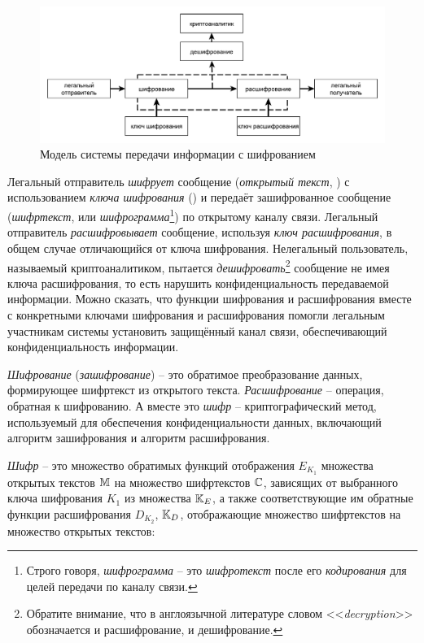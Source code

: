 \begin{figure}[!thb]
	\centering
	\includegraphics[width=1.0\textwidth]{pic/model-cipher}
	\caption{Модель системы передачи информации с шифрованием\label{pic:model-cipher}}
\end{figure}

Легальный отправитель \emph{шифрует} сообщение (\emph{открытый текст}, ) с использованием \emph{ключа шифрования} () и передаёт зашифрованное сообщение (\emph{шифртекст},  или \emph{шифрограмма}\footnote{Строго говоря, \emph{шифрограмма} -- это \emph{шифротекст} после его \emph{кодирования} для целей передачи по каналу связи.}) по открытому каналу связи. Легальный отправитель \emph{расшифровывает} сообщение, используя \emph{ключ расшифрования}, в общем случае отличающийся от ключа шифрования. Нелегальный пользователь, называемый криптоаналитиком, пытается \emph{дешифровать}\footnote{Обратите внимание, что в англоязычной литературе словом <<\textit{decryption}>> обозначается и расшифрование, и дешифрование.} сообщение не имея ключа расшифрования, то есть нарушить конфиденциальность передаваемой информации. Можно сказать, что функции шифрования и расшифрования вместе с конкретными ключами шифрования и расшифрования помогли легальным участникам системы установить защищённый канал связи, обеспечивающий конфиденциальность информации.

\emph{Шифрование} (\emph{зашифрование}) -- это обратимое преобразование данных, формирующее шифртекст из открытого текста. \emph{Расшифрование} -- операция, обратная к шифрованию. А вместе это \emph{шифр} -- криптографический метод, используемый для обеспечения конфиденциальности данных, включающий алгоритм зашифрования и алгоритм расшифрования.~\cite{GOST-89}

\emph{Шифр} -- это множество обратимых функций отображения $E_{K_1}$ множества открытых текстов $\mathbb{M}$ на множество шифртекстов $\mathbb{C}$, зависящих от выбранного ключа шифрования $K_1$ из множества $\mathbb{K}_E$, а также соответствующие им обратные функции расшифрования $D_{K_2}$, $\mathbb{K}_D$, отображающие множество шифртекстов на множество открытых текстов:

